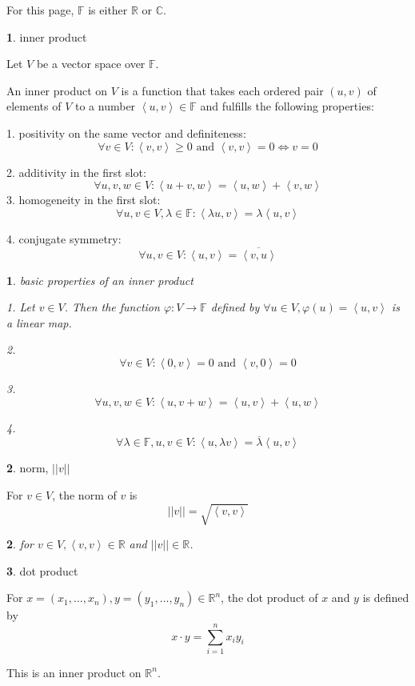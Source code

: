\documentclass[english]{article}
\theoremstyle{definition}
\newtheorem*{defn*}{\protect\definitionname}
\theoremstyle{plain}
\newtheorem*{lem*}{\protect\lemmaname}
\theoremstyle{plain}
\theoremstyle{definition}
\theoremstyle{definition}
\providecommand{\definitionname}{Definition}
\providecommand{\lemmaname}{Lemma}
\begin{document}
For this page, $\mathbb{F}$ is either $\mathbb{R}$ or $\mathbb{C}$.
\begin{defn*}
inner product

Let $V$ be a vector space over $\mathbb{F}$.

An inner product on $V$ is a function that takes each ordered pair
$\left(u,v\right)$ of elements of $V$ to a number $\left\langle u,v\right\rangle \in\mathbb{F}$
and fulfills the following properties: 

1. positivity on the same vector and definiteness:
\[
\forall v\in V:\left\langle v,v\right\rangle \ge0\text{ and }\left\langle v,v\right\rangle =0\iff v=0
\]

2. additivity in the first slot:
\[
\forall u,v,w\in V:\left\langle u+v,w\right\rangle =\left\langle u,w\right\rangle +\left\langle v,w\right\rangle 
\]
3. homogeneity in the first slot:
\[
\forall u,v\in V,\lambda\in\mathbb{F}:\left\langle \lambda u,v\right\rangle =\lambda\left\langle u,v\right\rangle 
\]

4. conjugate symmetry:
\[
\forall u,v\in V:\left\langle u,v\right\rangle =\overline{\left\langle v,u\right\rangle }
\]
\end{defn*}
\begin{lem*}
basic properties of an inner product

1. Let $v\in V$. Then the function $\varphi:V\rightarrow\mathbb{F}$
defined by $\forall u\in V,\varphi(u)=\left\langle u,v\right\rangle $
is a linear map.

2. 
\[
\forall v\in V:\left\langle 0,v\right\rangle =0\text{ and }\left\langle v,0\right\rangle =0
\]

3.
\[
\forall u,v,w\in V:\left\langle u,v+w\right\rangle =\left\langle u,v\right\rangle +\left\langle u,w\right\rangle 
\]

4. 
\[
\forall\lambda\in\mathbb{F},u,v\in V:\left\langle u,\lambda v\right\rangle =\overline{\lambda}\left\langle u,v\right\rangle 
\]
\end{lem*}
\begin{defn*}
norm, $||v||$

For $v\in V$, the norm of $v$ is 
\[
||v||=\sqrt{\left\langle v,v\right\rangle }
\]
\end{defn*}
\begin{lem*}
for $v\in V,\left\langle v,v\right\rangle \in\mathbb{R}$ and $\left|\left|v\right|\right|\in\mathbb{R}$.
\end{lem*}
\begin{defn*}
dot product

For $x=\left(x_{1},\dots,x_{n}\right),y=\left(y_{1},\dots,y_{n}\right)\in\mathbb{R}^{n}$,
the dot product of $x$ and $y$ is defined by
\[
x\cdot y=\underset{i=1}{\overset{n}{\sum}}x_{i}y_{i}
\]

This is an inner product on $\mathbb{R}^{n}$.
\end{defn*}
\end{document}
